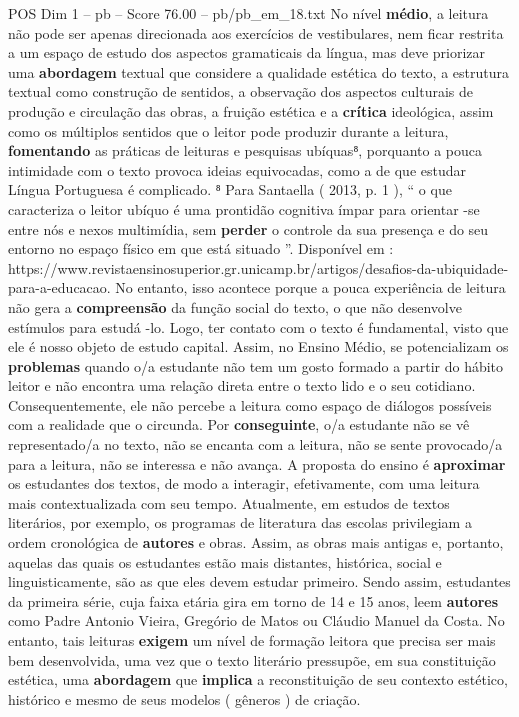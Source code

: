 \begin{textsample}{POS Dim 1 – pb – Score 76.00 – pb/pb\_em\_18.txt}
No nível \textbf{médio}, a leitura não pode ser apenas direcionada aos exercícios de vestibulares, nem ficar restrita a um espaço de estudo dos aspectos gramaticais da língua, mas deve priorizar uma \textbf{abordagem} textual que considere a qualidade estética do texto, a estrutura textual como construção de sentidos, a observação dos aspectos culturais de produção e circulação das obras, a fruição estética e a \textbf{crítica} ideológica, assim como os múltiplos sentidos que o leitor pode produzir durante a leitura, \textbf{fomentando} as práticas de leituras e pesquisas ubíquas⁸, porquanto a pouca intimidade com o texto provoca ideias equivocadas, como a de que estudar Língua Portuguesa é complicado. ⁸ Para Santaella ( 2013, p. 1 ), “ o que caracteriza o leitor ubíquo é uma prontidão cognitiva ímpar para orientar -se entre nós e nexos multimídia, sem \textbf{perder} o controle da sua presença e do seu entorno no espaço físico em que está situado ”.
Disponível em : https://www.revistaensinosuperior.gr.unicamp.br/artigos/desafios-da-ubiquidade-para-a-educacao.
No entanto, isso acontece porque a pouca experiência de leitura não gera a \textbf{compreensão} da função social do texto, o que não desenvolve estímulos para estudá -lo.
Logo, ter contato com o texto é fundamental, visto que ele é nosso objeto de estudo capital.
Assim, no Ensino Médio, se potencializam os \textbf{problemas} quando o/a estudante não tem um gosto formado a partir do hábito leitor e não encontra uma relação direta entre o texto lido e o seu cotidiano.
Consequentemente, ele não percebe a leitura como espaço de diálogos possíveis com a realidade que o circunda.
Por \textbf{conseguinte}, o/a estudante não se vê representado/a no texto, não se encanta com a leitura, não se sente provocado/a para a leitura, não se interessa e não avança.
A proposta do ensino é \textbf{aproximar} os estudantes dos textos, de modo a interagir, efetivamente, com uma leitura mais contextualizada com seu tempo.
Atualmente, em estudos de textos literários, por exemplo, os programas de literatura das escolas privilegiam a ordem cronológica de \textbf{autores} e obras.
Assim, as obras mais antigas e, portanto, aquelas das quais os estudantes estão mais distantes, histórica, social e linguisticamente, são as que eles devem estudar primeiro.
Sendo assim, estudantes da primeira série, cuja faixa etária gira em torno de 14 e 15 anos, leem \textbf{autores} como Padre Antonio Vieira, Gregório de Matos ou Cláudio Manuel da Costa.
No entanto, tais leituras \textbf{exigem} um nível de formação leitora que precisa ser mais bem desenvolvida, uma vez que o texto literário pressupõe, em sua constituição estética, uma \textbf{abordagem} que \textbf{implica} a reconstituição de seu contexto estético, histórico e mesmo de seus modelos ( gêneros ) de criação.

\end{textsample}
